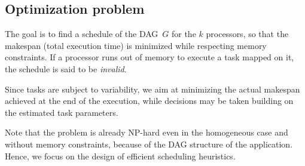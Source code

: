 \documentclass[conference]{IEEEtran}
\newcommand{\hmey}[1]{{\color{red}[HM: #1]}}
\begin{document}
\subsection{Optimization problem}
\label{sec.mod.pb}

The goal is to find a schedule of the DAG~$G$ for the $k$ processors,
so that the makespan (total execution time) is minimized while
respecting memory constraints. If a processor runs out of memory to execute
a task mapped on it, the schedule is said to be {\em invalid}.

Since tasks are subject to variability, we aim at minimizing the actual makespan
achieved at the end of the execution, while decisions may be taken building
on the estimated task parameters.

Note that the problem is already NP-hard even in the homogeneous case and 
without memory constraints, because of the DAG structure of the application. 
Hence, we focus on the design of efficient scheduling heuristics. 
\end{document}
